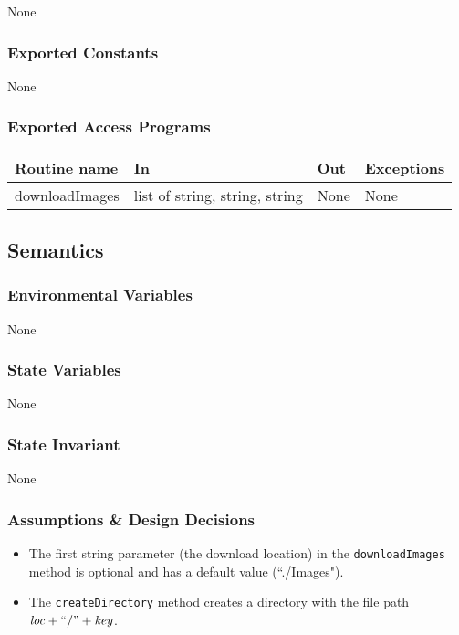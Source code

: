 \documentclass{article}
\begin{document}
None

\subsubsection* {Exported Constants}

None

\subsubsection* {Exported Access Programs}

\begin{tabular}{| l | l | l | p{5cm} |}
\hline
\textbf{Routine name} & \textbf{In} & \textbf{Out} & \textbf{Exceptions}\\
\hline
downloadImages & list of string, string, string & None & None\\
\hline

\end{tabular}

\subsection* {Semantics}

\subsubsection* {Environmental Variables}

None

\subsubsection* {State Variables}

None

\subsubsection* {State Invariant}

None

\subsubsection* {Assumptions \& Design Decisions}

\begin{itemize}
\item The first string parameter (the download location) in the \texttt{downloadImages} method is optional and has a default value (``./Images").
\item The \texttt{createDirectory} method creates a directory with the file path $\mathit{loc} + ``/" + \mathit{key}$.
\end{itemize}
\end{document}
